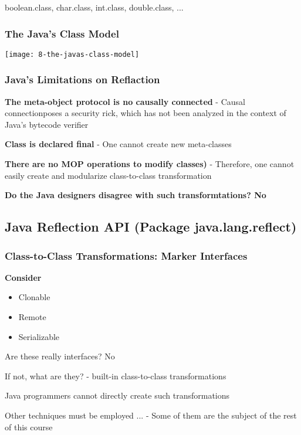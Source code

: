 boolean.class, char.class, int.class, double.class, ...

\subsubsection{The Java's Class Model}

\begin{center}
\texttt{[image: 8-the-javas-class-model]}
\end{center}

\subsubsection{Java's Limitations on Reflaction}

\textbf{The meta-object protocol is no causally connected}
	- Causal connectionposes a security rick, which has not been analyzed in the context of Java's bytecode verifier

\textbf{Class is declared final}
	- One cannot create new meta-classes

\textbf{There are no MOP operations to modify classes)}
	- Therefore, one cannot easily create and modularize class-to-class transformation

\textbf{Do the Java designers disagree with such transformtations? No}

\subsection{Java Reflection API (Package java.lang.reflect)}

\subsubsection{Class-to-Class Transformations: Marker Interfaces}

\textbf{Consider}
\begin{itemize}
	\item Clonable
	\item Remote
	\item Serializable
\end{itemize}

Are these really interfaces? No

If not, what are they?
	- built-in class-to-class transformations

Java programmers cannot directly create such transformations

Other techniques must be employed ...
	- Some of them are the subject of the rest of this course


